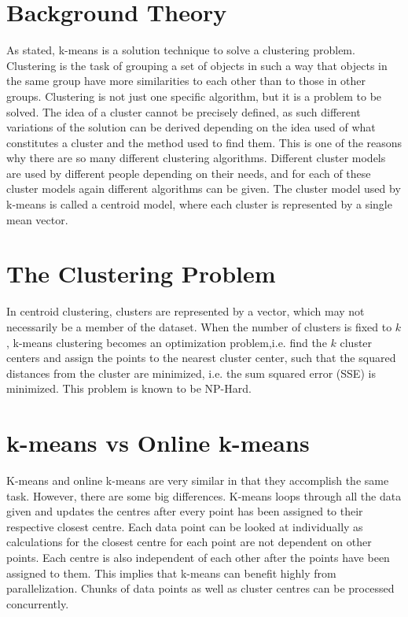 \documentclass{article}
\begin{document}
\section{Background Theory}
As stated, k-means is a solution technique to solve a clustering problem. Clustering is the task of grouping a set of objects in such a way that objects in the same group have more similarities to each other than to those in other groups. Clustering is not just one specific algorithm, but it is a problem to be solved. The idea of a cluster cannot be precisely defined, as such different variations of the solution can be derived depending on the idea used of what constitutes a cluster and the method used to find them. This is one of the reasons why there are so many different clustering algorithms. Different cluster models are used by different people depending on their needs, and for each of these cluster models again different algorithms can be given. The cluster model used by k-means is called a centroid model, where each cluster is represented by a single mean vector.

\section{The Clustering Problem}
In centroid clustering, clusters are represented by a vector, which may not necessarily be a member of the dataset. When the number of clusters is fixed to $k$, k-means clustering becomes an optimization problem,i.e. find the $k$ cluster centers and assign the points to the nearest cluster center, such that the squared distances from the cluster are minimized, i.e. the sum squared error (SSE) is minimized. This problem is known to be NP-Hard.


\newpage
\section{k-means vs Online k-means}
K-means and online k-means are very similar in that they accomplish the same task. However, there are some big differences. K-means loops through all the data given and updates the centres after every point has been assigned to their respective closest centre. Each data point can be looked at individually as calculations for the closest centre for each point are not dependent on other points. Each centre is also independent of each other after the points have been assigned to them. This implies that k-means can benefit highly from parallelization. Chunks of data points as well as cluster centres can be processed concurrently.
\end{document}
